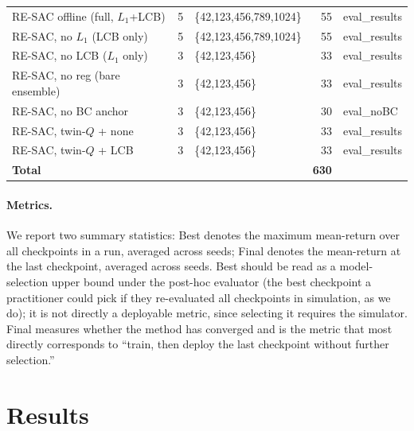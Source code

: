 \documentclass[journal,10pt]{IEEEtran}
\begin{document}
\begin{table}[!t]
\begin{tabular}{@{}lrlrl@{}}
RE-SAC offline (full, $L_1$+LCB) & 5 & \{42,123,456,789,1024\} & 55 & eval\_results \\
RE-SAC, no $L_1$ (LCB only)      & 5 & \{42,123,456,789,1024\} & 55 & eval\_results \\
RE-SAC, no LCB ($L_1$ only)      & 3 & \{42,123,456\}        & 33 & eval\_results \\
RE-SAC, no reg (bare ensemble)   & 3 & \{42,123,456\}        & 33 & eval\_results \\
RE-SAC, no BC anchor              & 3 & \{42,123,456\}        & 30 & eval\_noBC \\
RE-SAC, twin-$Q$ + none           & 3 & \{42,123,456\}        & 33 & eval\_results \\
RE-SAC, twin-$Q$ + LCB            & 3 & \{42,123,456\}        & 33 & eval\_results \\
\midrule
\textbf{Total}              &  &                            & \textbf{630} &  \\
\bottomrule
\end{tabular}
\end{table}

\paragraph{Metrics.} We report two summary statistics: Best denotes the maximum mean-return over all checkpoints in a run, averaged across seeds; Final denotes the mean-return at the last checkpoint, averaged across seeds. Best should be read as a model-selection upper bound under the post-hoc evaluator (the best checkpoint a practitioner could pick if they re-evaluated all checkpoints in simulation, as we do); it is not directly a deployable metric, since selecting it requires the simulator. Final measures whether the method has converged and is the metric that most directly corresponds to ``train, then deploy the last checkpoint without further selection.''

\section{Results}
\label{sec:results}
\end{document}
